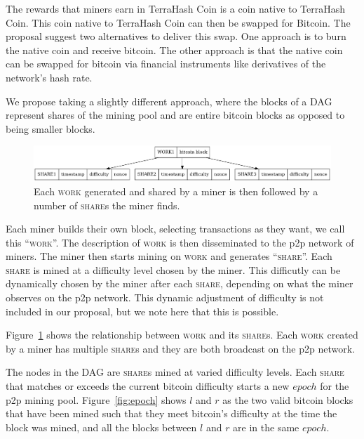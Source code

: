 \documentclass{article}
\begin{document}
The rewards that miners earn in TerraHash Coin is a coin native to
TerraHash Coin. This coin native to TerraHash Coin can then be swapped
for Bitcoin. The proposal suggest two alternatives to deliver this
swap. One approach is to burn the native coin and receive bitcoin. The
other approach is that the native coin can be swapped for bitcoin via
financial instruments like derivatives of the network's hash rate.

We propose taking a slightly different approach, where the blocks of a
DAG represent shares of the mining pool and are entire bitcoin blocks
as opposed to being smaller blocks.

\begin{figure}[h]
  \begin{center}
    \includegraphics[width=1.0\textwidth]{work-share}
    \caption{Each \textsc{work} generated and shared by a miner is then
      followed by a number of \textsc{share}s the miner
      finds.}\label{fig:work-share}
    \end{center}
\end{figure}

Each miner builds their own block, selecting transactions as they
want, we call this ``\textsc{work}''. The description of \textsc{work}
is then disseminated to the p2p network of miners. The miner then
starts mining on \textsc{work} and generates ``\textsc{share}''. Each
\textsc{share} is mined at a difficulty level chosen by the
miner. This difficutly can be dynamically chosen by the miner after
each \textsc{share}, depending on what the miner observes on the p2p
network. This dynamic adjustment of difficulty is not included in our
proposal, but we note here that this is possible.

Figure~\ref{fig:work-share} shows the relationship between
\textsc{work} and its \textsc{share}s. Each \textsc{work} created by a
miner has multiple \textsc{share}s and they are both broadcast on the
p2p network.

The nodes in the DAG are \textsc{share}s mined at varied difficulty
levels. Each \textsc{share} that matches or exceeds the current
bitcoin difficulty starts a new $epoch$ for the p2p mining
pool. Figure~\ref{fig:epoch} shows $l$ and $r$ as the two valid
bitcoin blocks that have been mined such that they meet bitcoin's
difficulty at the time the block was mined, and all the blocks between
$l$ and $r$ are in the same $epoch$.
\end{document}
